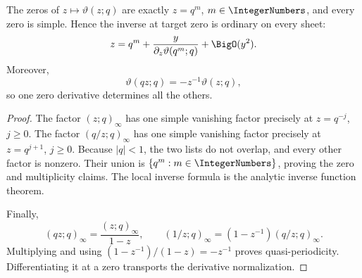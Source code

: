 \begin{proposition}
\label{prop:qs-theta-zeros}
The zeros of \(z\mapsto\vartheta(z;q)\) are exactly
\(z=q^m\), \(m\in\IntegerNumbers\), and every zero is simple.  Hence the inverse at target
zero is ordinary on every sheet:
\[
  z=q^m+\frac{y}{\partial_z\vartheta(q^m;q)}+\BigO(y^2).
\]
Moreover,
\[
  \vartheta(qz;q)=-z^{-1}\vartheta(z;q),
\]
so one zero derivative determines all the others.
\end{proposition}

\begin{proof}
The factor \((z;q)_\infty\) has one simple vanishing factor precisely at
\(z=q^{-j}\), \(j\ge0\).  The factor \((q/z;q)_\infty\) has one simple
vanishing factor precisely at \(z=q^{j+1}\), \(j\ge0\).  Because
\(|q|<1\), the two lists do not overlap, and every other factor is nonzero.
Their union is \(\{q^m:m\in\IntegerNumbers\}\), proving the zero and multiplicity claims.
The local inverse formula is the analytic inverse function theorem.

Finally,
\[
  (qz;q)_\infty=\frac{(z;q)_\infty}{1-z},
  \qquad
  (1/z;q)_\infty=(1-z^{-1})(q/z;q)_\infty.
\]
Multiplying and using
\((1-z^{-1})/(1-z)=-z^{-1}\) proves quasi-periodicity.  Differentiating it
at a zero transports the derivative normalization.
\end{proof}
